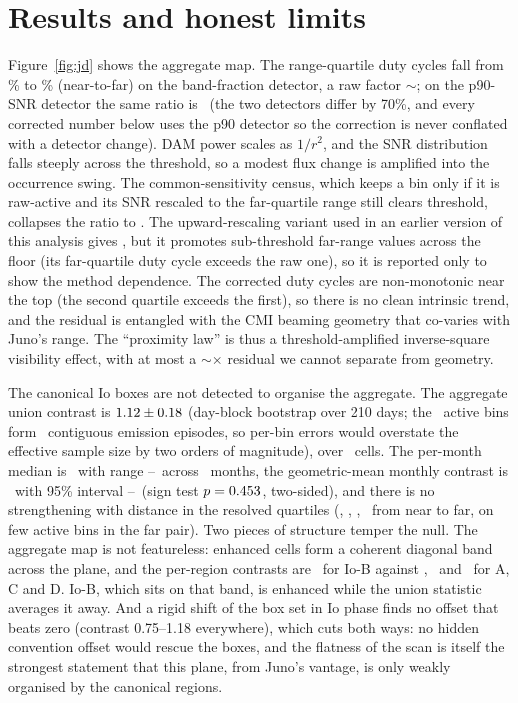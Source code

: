 \documentclass[twocolumn]{aastex631}
\begin{document}
\section{Results and honest limits}
Figure~\ref{fig:jd} shows the aggregate map. The range-quartile duty cycles fall from
\jdAqA\% to \jdAqD\% (near-to-far) on the band-fraction detector, a raw factor
$\sim$\jdNearFarRaw; on the p90-SNR detector the same ratio is \jdNearFarRawPninety\ (the two
detectors differ by 70\%, and every corrected number below uses the p90 detector so the
correction is never conflated with a detector change). DAM power scales as $1/r^2$, and the SNR
distribution falls steeply across the threshold, so a modest flux change is amplified into the
occurrence swing. The common-sensitivity census, which keeps a bin only if it is raw-active and
its SNR rescaled to the far-quartile range still clears threshold, collapses the ratio to
\jdNearFarCens. The upward-rescaling variant used in an earlier version of this analysis gives
\jdNearFarCorr, but it promotes sub-threshold far-range values across the floor (its
far-quartile duty cycle exceeds the raw one), so it is reported only to show the method
dependence. The corrected duty cycles are non-monotonic near the top (the second quartile
exceeds the first), so there is no clean intrinsic trend, and the residual is entangled with the
CMI beaming geometry that co-varies with Juno's range. The ``proximity law'' is thus a
threshold-amplified inverse-square visibility effect, with at most a
$\sim$\jdNearFarCens$\times$ residual we cannot separate from geometry.

The canonical Io boxes are not detected to organise the aggregate. The aggregate union
contrast is $1.12\pm0.18$ (day-block bootstrap over 210 days; the
\jdRealNact\ active bins form \jdNEpisodes\ contiguous emission episodes, so per-bin errors
would overstate the effective sample size by two orders of magnitude), over \jdRealCells\
cells. The per-month median is \jdCmMed\ with range \jdCmMin--\jdCmMax\ across \jdNmonths\
months, the geometric-mean monthly contrast is \jdMonthGeoMean\ with 95\% interval
\jdMonthCIlo--\jdMonthCIhi\ (sign test $p=0.453$, two-sided), and there is no
strengthening with distance in the resolved quartiles (\jdCqA, \jdCqB, \jdCqC, \jdCqD\ from
near to far, on few active bins in the far pair). Two pieces of structure temper the null. The
aggregate map is not featureless: enhanced cells form a coherent diagonal band across the
plane, and the per-region contrasts are \jdRegB\ for Io-B against \jdRegA, \jdRegC\ and
\jdRegD\ for A, C and D. Io-B, which sits on that band, is enhanced while the union
statistic averages it away. And a rigid shift of the box set in Io phase finds no offset that
beats zero (contrast 0.75--1.18 everywhere), which cuts both ways: no hidden convention offset
would rescue the boxes, and the flatness of the scan is itself the strongest statement that
this plane, from Juno's vantage, is only weakly organised by the canonical regions.
\end{document}
